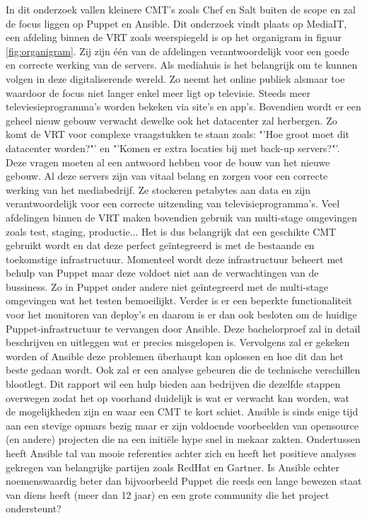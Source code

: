 In dit onderzoek vallen kleinere CMT's zoals Chef en Salt buiten de scope en zal de focus liggen op Puppet en Ansible. Dit onderzoek vindt plaats op MediaIT, een afdeling binnen de VRT zoals weerspiegeld is op het organigram in figuur \ref{fig:organigram}. Zij zijn \'e\'en van de afdelingen verantwoordelijk voor een goede en correcte werking van de servers.
\newline
Als mediahuis is het belangrijk om te kunnen volgen in deze digitaliserende wereld. Zo neemt het online publiek alsmaar toe waardoor de focus niet langer enkel meer ligt op televisie. Steeds meer televiesieprogramma's worden bekeken via site's en app's. Bovendien wordt er een geheel nieuw gebouw verwacht dewelke ook het datacenter zal herbergen. Zo komt de VRT voor complexe vraagstukken te staan zoals: "'Hoe groot moet dit datacenter worden?"'  en "'Komen er extra locaties bij met back-up servers?"'.  Deze vragen moeten al een antwoord hebben voor de bouw van het nieuwe gebouw. \newline
Al deze servers zijn van vitaal belang en zorgen voor een correcte werking van het mediabedrijf. Ze stockeren petabytes aan data en zijn verantwoordelijk voor een correcte uitzending van televisieprogramma's. Veel afdelingen binnen de VRT maken bovendien gebruik van multi-stage omgevingen zoals test, staging, productie... Het is dus belangrijk dat een geschikte CMT gebruikt wordt en dat deze perfect ge\"integreerd is met de bestaande en toekomstige infrastructuur.
\newline
Momenteel wordt deze infrastructuur beheert met behulp van Puppet maar deze voldoet niet aan de verwachtingen van de bussiness. Zo in Puppet onder andere niet ge\"integreerd met de multi-stage omgevingen wat het testen bemoeilijkt. Verder is er een beperkte functionaliteit voor het monitoren van deploy's en daarom is er dan ook besloten om de huidige Puppet-infrastructuur te vervangen door Ansible.\newline
Deze bachelorproef zal in deta\"il beschrijven en uitleggen wat er precies misgelopen is. Vervolgens zal er gekeken worden of Ansible deze problemen \"uberhaupt kan oplossen en hoe dit dan het beste gedaan wordt. Ook zal er een analyse gebeuren die de technische verschillen blootlegt.  Dit rapport wil een hulp bieden aan bedrijven die dezelfde stappen overwegen zodat het op voorhand duidelijk is wat er verwacht kan worden, wat de mogelijkheden zijn en waar een CMT te kort schiet. Ansible is sinds enige tijd aan een stevige opmars bezig maar er zijn voldoende voorbeelden van opensource (en andere) projecten die na een initi\"ele hype snel in mekaar zakten. Ondertussen heeft Ansible tal van mooie referenties achter zich en heeft het positieve analyses gekregen van belangrijke partijen zoals RedHat en Gartner. Is Ansible echter noemenswaardig beter dan bijvoorbeeld Puppet die reeds een lange bewezen staat van diens heeft (meer dan 12 jaar) en een grote community die het project ondersteunt?

